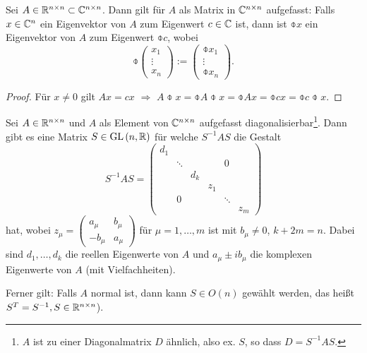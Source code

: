 \begin{lem}
 Sei $A \in \mathbb{R}^{n \times n} \subset \mathbb{C}^{n \times n}$. Dann gilt für $A$ als Matrix in $\mathbb{C}^{n \times n}$ aufgefasst: Falls $x \in \mathbb{C}^n$ ein Eigenvektor von $A$ zum Eigenwert $c \in \mathbb{C}$ ist, dann ist $\obar{x}$ ein Eigenvektor von $A$ zum Eigenwert $\obar{c}$, wobei
 \[ \obar{\begin{pmatrix} x_1 \\ \vdots \\ x_n \end{pmatrix}} := \begin{pmatrix} \obar{x}_1 \\ \vdots \\ \obar{x}_n \end{pmatrix}. \]
\end{lem}

\begin{proof}
 Für $x \ne 0$ gilt $Ax = cx $ $\Rightarrow$  $A\obar{x} = \obar{A}\obar{x} = \obar{Ax} = \obar{cx} = \obar{c} \obar{x}$.
\end{proof}

\begin{thm}
 Sei $A \in \mathbb{R}^{n \times n}$ und $A$ als Element von $\mathbb{C}^{n \times n}$ aufgefasst diagonalisierbar\footnote{$A$ ist zu einer Diagonalmatrix $D$ ähnlich, also ex. $S$, so dass $D=S^{-1} A S$.}. Dann gibt es eine Matrix $S \in \mathrm{GL}\,(n, \mathbb{R})$ für welche $S^{-1} A S$ die Gestalt
 \[ S^{-1} A S = \begin{pmatrix}
     d_1 &        &     &     &        &      \\
         & \ddots &     &     & 0      &      \\
         &        & d_k &     &        &      \\
         &        &     & \boxed{z_1} &        &      \\
         & 0      &     &     & \ddots &      \\
         &        &     &     &        & \boxed{z_m}
    \end{pmatrix} \]
 hat, wobei $z_\mu = \begin{pmatrix} a_\mu & b_\mu \\ -b_\mu & a_\mu \end{pmatrix}$ für $\mu = 1, \ldots, m$ ist mit $b_\mu \ne 0$, $k+2m = n$. Dabei sind $d_1, \ldots, d_k$ die reellen Eigenwerte von $A$ und $a_\mu \pm i b_\mu$ die komplexen Eigenwerte von $A$ (mit Vielfachheiten).
 
 Ferner gilt: Falls $A$ normal ist, dann kann $S \in O(n)$ gewählt werden, das heißt $S^T = S^{-1}, S \in \mathbb{R}^{n \times n}$).
\end{thm}

